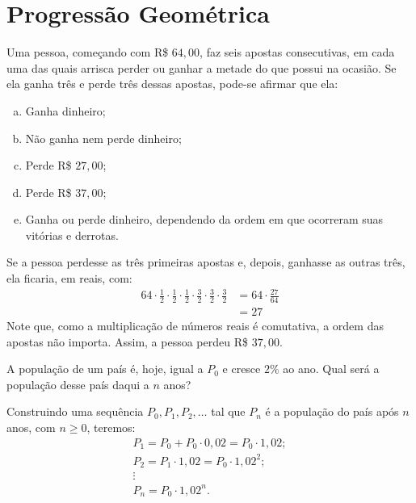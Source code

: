 \section{Progressão Geométrica}

\begin{example}
Uma pessoa, começando com R\$ $64{,}00$, faz seis apostas consecutivas, em cada uma das quais arrisca perder ou ganhar a metade do que possui na ocasião. Se ela ganha três e perde três dessas apostas, pode-se afirmar que ela:
%
\begin{enumerate}[a)]
  \item Ganha dinheiro;
  \item Não ganha nem perde dinheiro;
  \item Perde R\$ $27{,}00$;
  \item Perde R\$ $37{,}00$;
  \item Ganha ou perde dinheiro, dependendo da ordem em que ocorreram suas vitórias e derrotas.
\end{enumerate}
\end{example}

\begin{solution}
Se a pessoa perdesse as três primeiras apostas e, depois, ganhasse as outras três, ela ficaria, em reais, com:
%
\begin{align*}
64 \cdot \frac 1 2 \cdot \frac 1 2 \cdot \frac 1 2 \cdot \frac 3 2\cdot \frac 3 2\cdot \frac 3 2 &= 64 \cdot \frac {27} {64} \\ &= 27
\end{align*}
%
Note que, como a multiplicação de números reais é comutativa, a ordem das apostas não importa. Assim, a pessoa perdeu R\$ $37{,}00$.
\end{solution}

\begin{example}
\label{example:pg-pop-pais}
A população de um país é, hoje, igual a $P_0$ e cresce $2 \%$ ao ano. Qual será a população desse país daqui a $n$ anos?
\end{example}

\begin{solution}
Construindo uma sequência $P_0, P_1, P_2, \dots$ tal que $P_n$ é a população do país após $n$ anos, com $n \ge 0$, teremos:
%
\begin{gather*}
P_1 = P_0 + P_0 \cdot 0{,}02 = P_0 \cdot 1{,}02; \\
P_2 = P_1 \cdot 1{,}02 = P_0 \cdot 1{,}02 ^2; \\
\vdots \\
P_n = P_0 \cdot 1{,}02 ^n.
\end{gather*}
\end{solution}

